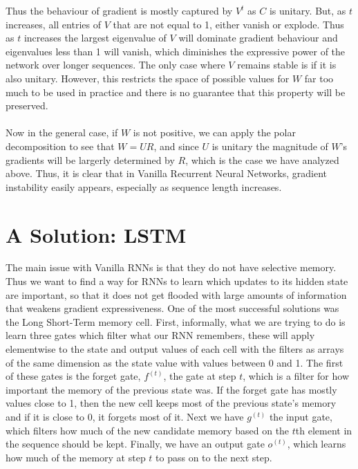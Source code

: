 \documentclass[12pt]{article}
\begin{document}
Thus the behaviour of gradient is mostly captured by $V^t$ as $C$ is unitary. But, as $t$ increases, all entries
of $V$ that are not equal to 1, either vanish or explode. Thus as $t$ increases the largest eigenvalue of $V$
will dominate gradient behaviour and eigenvalues less than 1 will vanish, which diminishes the expressive power of the network over longer sequences. The only case where $V$ remains stable
is if it is also unitary. However, this restricts the space of possible values for $W$ far too much to be used in practice and there is no guarantee
that this property will be preserved.
\\\\
Now in the general case, if $W$ is not positive, we can apply the polar decomposition to see that $W = UR$, and since $U$ is unitary
the magnitude of $W$'s gradients will be largerly determined by $R$, which is the case we have analyzed above. Thus, it is clear that in Vanilla
Recurrent Neural Networks, gradient instability easily appears, especially as sequence length increases.

\section*{A Solution: LSTM}
The main issue with Vanilla RNNs is that they do not have selective memory. Thus we want to find a way for RNNs to learn which updates to its hidden state
are important, so that it does not get flooded with large amounts of information that weakens gradient expressiveness. One of the most successful solutions was
the Long Short-Term memory cell. First, informally, what we are trying to do is learn three gates which filter what our RNN remembers, these will apply
elementwise to the state and output values of each cell with the filters as arrays of the same dimension as the state value with values between 0 and 1. 
The first of these gates is the forget gate, $f^{(t)}$, the gate at step $t$, which is a filter for how important the memory of the previous state was. If the forget gate has mostly values
close to 1, then the new cell keeps most of the previous state's memory and if it is close to 0, it forgets most of it. Next we have $g^{(t)}$ the input gate, which filters
how much of the new candidate memory based on the $t$th element in the sequence should be kept. Finally, we have an output gate $o^{(t)}$, which learns how much
of the memory at step $t$ to pass on to the next step.
\end{document}
